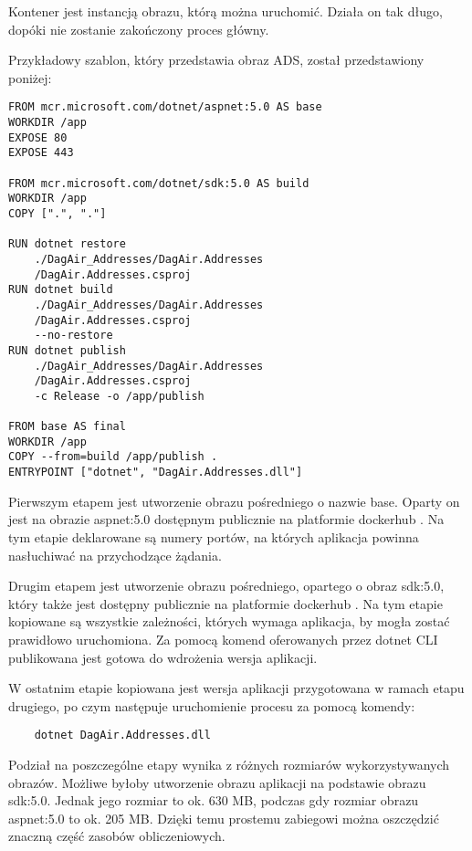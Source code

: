 Kontener jest instancją obrazu, którą można uruchomić. Działa on tak długo, dopóki nie zostanie
zakończony proces główny.

Przykładowy szablon, który przedstawia obraz ADS, został przedstawiony poniżej:

\begin{lstlisting}
FROM mcr.microsoft.com/dotnet/aspnet:5.0 AS base
WORKDIR /app
EXPOSE 80
EXPOSE 443

FROM mcr.microsoft.com/dotnet/sdk:5.0 AS build
WORKDIR /app
COPY [".", "."]

RUN dotnet restore 
    ./DagAir_Addresses/DagAir.Addresses
    /DagAir.Addresses.csproj
RUN dotnet build 
    ./DagAir_Addresses/DagAir.Addresses
    /DagAir.Addresses.csproj 
    --no-restore
RUN dotnet publish 
    ./DagAir_Addresses/DagAir.Addresses
    /DagAir.Addresses.csproj 
    -c Release -o /app/publish

FROM base AS final
WORKDIR /app
COPY --from=build /app/publish .
ENTRYPOINT ["dotnet", "DagAir.Addresses.dll"]
\end{lstlisting}

Pierwszym etapem jest utworzenie obrazu pośredniego o nazwie base. Oparty on jest na obrazie 
aspnet:5.0 dostępnym publicznie na platformie dockerhub \cite{aspnet2022}.
Na tym etapie deklarowane są
numery portów, na których aplikacja powinna nasłuchiwać na przychodzące żądania.

Drugim etapem jest utworzenie obrazu pośredniego, opartego o obraz sdk:5.0, który także jest dostępny publicznie
na platformie dockerhub \cite{dotnetsdk2022}. Na tym etapie kopiowane
są wszystkie zależności, których wymaga aplikacja, by mogła zostać prawidłowo uruchomiona.
Za pomocą komend oferowanych przez dotnet CLI publikowana jest gotowa do wdrożenia wersja aplikacji.

W ostatnim etapie kopiowana jest wersja aplikacji przygotowana w ramach etapu drugiego, po czym
następuje uruchomienie procesu za pomocą komendy:

\begin{lstlisting}
    dotnet DagAir.Addresses.dll
\end{lstlisting}

Podział na poszczególne etapy wynika z różnych rozmiarów wykorzystywanych obrazów. Możliwe byłoby
utworzenie obrazu aplikacji na podstawie obrazu sdk:5.0. Jednak jego rozmiar to ok. 630 MB, podczas
gdy rozmiar obrazu aspnet:5.0 to ok. 205 MB. Dzięki temu prostemu zabiegowi można oszczędzić 
znaczną część zasobów obliczeniowych. 

